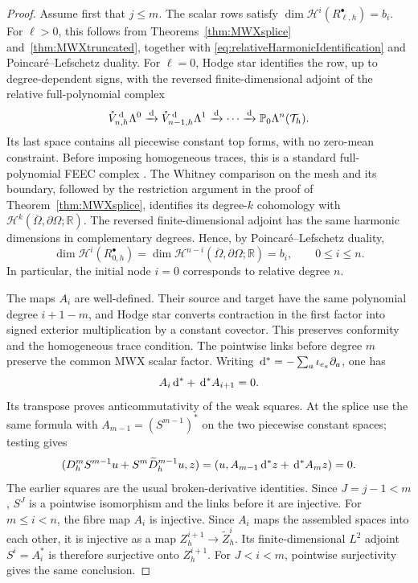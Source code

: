 \documentclass[10pt]{amsart}
\numberwithin{equation}{section}
\newcommand{\dd}{\,{\rm d}}
\begin{document}
\begin{proof}
Assume first that $j\leq m$.
The scalar rows satisfy $\dim \mathscr H^i(R_{\ell,h}^\bullet)=b_i$.
For $\ell>0$, this follows from Theorems~\ref{thm:MWXsplice}
and~\ref{thm:MWXtruncated}, together with
\eqref{eq:relativeHarmonicIdentification} and Poincar\'e--Lefschetz duality.
For $\ell=0$, Hodge star identifies the row, up to degree-dependent
signs, with the reversed finite-dimensional adjoint of the relative
full-polynomial complex
\[
\mathring V_{n,h}^{\dd}\Lambda^0\xrightarrow{\dd}
\mathring V_{n-1,h}^{\dd}\Lambda^1\xrightarrow{\dd}\cdots
\xrightarrow{\dd}\mathbb P_0\Lambda^n(\mathcal T_h).
\]
Its last space contains all piecewise constant top forms, with no
zero-mean constraint. Before imposing homogeneous traces, this is a
standard full-polynomial FEEC complex
\cite[Sections~5.2 and~5.6]{ArnoldFalkWinther2010}.
The Whitney comparison on the mesh and its boundary, followed by the
restriction argument in the proof of Theorem~\ref{thm:MWXsplice},
identifies its degree-$k$ cohomology with
$\mathscr H^k(\overline\Omega,\partial\Omega;\mathbb R)$.
The reversed finite-dimensional adjoint has the same harmonic dimensions
in complementary degrees. Hence, by Poincar\'e--Lefschetz duality,
\[
\dim \mathscr H^i(R_{0,h}^\bullet)
=\dim \mathscr H^{n-i}(\overline\Omega,\partial\Omega;\mathbb R)=b_i,
\qquad 0\leq i\leq n.
\]
In particular, the initial node $i=0$ corresponds to relative degree $n$.

The maps $A_i$ are well-defined. Their source and target have the same
polynomial degree $i+1-m$, and Hodge star converts contraction in the
first factor into signed exterior multiplication by a constant covector.
This preserves conformity and the homogeneous trace condition.
The pointwise links before degree $m$ preserve the common MWX scalar factor.
Writing $\dd^*=-\sum_a\iota_{e_a}\partial_a$, one has
\[
A_i\dd^*+\dd^*A_{i+1}=0.
\]
Its transpose proves anticommutativity of the weak squares.
At the splice use the same formula with
$A_{m-1}=(S^{m-1})^*$ on the two piecewise constant spaces; testing gives
\[
(D_h^mS^{m-1}u+S^m\widetilde D_h^{m-1}u,z)
=(u,A_{m-1}\dd^*z+\dd^*A_mz)=0.
\]
The earlier squares are the usual broken-derivative identities.
Since $J=j-1<m$, $S^J$ is a pointwise isomorphism and the links before
it are injective. For $m\leq i<n$, the fibre map $A_i$ is injective.
Since $A_i$ maps the assembled spaces into each other, it is injective
as a map $Z_h^{i+1}\to\widetilde Z_h^i$.
Its finite-dimensional $L^2$ adjoint $S^i=A_i^*$ is therefore
surjective onto $Z_h^{i+1}$.
For $J<i<m$, pointwise surjectivity gives the same conclusion.


\end{proof}
\end{document}
